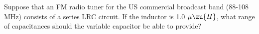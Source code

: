 Suppose that an FM radio tuner for the US commercial broadcast band
(88-108 MHz) consists of a series LRC circuit.
If the inductor is 1.0 $\mu\zu{H}$,  what range of
        capacitances should the variable capacitor be able to provide?\answercheck
